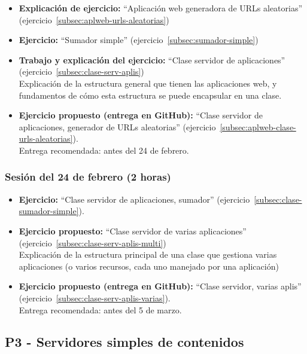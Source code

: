 \documentclass[a4paper,12pt]{article}
\begin{document}
\begin{itemize}
 \item \textbf{Explicación de ejercicio:} ``Aplicación web generadora de URLs aleatorias'' (ejercicio~\ref{subsec:aplweb-urls-aleatorias})
 \item \textbf{Ejercicio:} ``Sumador simple'' (ejercicio~\ref{subsec:sumador-simple}) \\
 \item \textbf{Trabajo y explicación del ejercicio:} ``Clase servidor de aplicaciones'' (ejercicio~\ref{subsec:clase-serv-aplis}) \\
   Explicación de la estructura general que tienen las aplicaciones web, y fundamentos de cómo esta estructura se puede encapsular en una clase.
 \item \textbf{Ejercicio propuesto (entrega en GitHub):} ``Clase servidor de aplicaciones, generador de URLs aleatorias'' (ejercicio~\ref{subsec:aplweb-clase-urls-aleatorias}). \\
   Entrega recomendada: antes del 24 de febrero.
\end{itemize}

\subsubsection{Sesión del 24 de febrero (2 horas)}

\begin{itemize}
 \item \textbf{Ejercicio:} ``Clase servidor de aplicaciones, sumador'' (ejercicio~\ref{subsec:clase-sumador-simple}). 
 \item \textbf{Ejercicio propuesto:}  ``Clase servidor de varias aplicaciones'' (ejercicio~\ref{subsec:clase-serv-aplis-multi}) \\
   Explicación de la estructura principal de una clase que gestiona varias aplicaciones (o varios recursos, cada uno manejado por una aplicación)
 \item \textbf{Ejercicio propuesto (entrega en GitHub):} ``Clase servidor, varias aplis'' (ejercicio~\ref{subsec:clase-serv-aplis-varias}). \\
   Entrega recomendada: antes del 5 de marzo.
\end{itemize}

\subsection{P3 - Servidores simples de contenidos}
\end{document}
